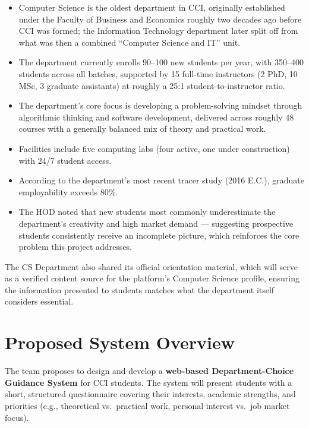 \documentclass[12pt, a4paper]{article}
\begin{document}
\begin{itemize}[leftmargin=1.5em, itemsep=3pt]
\item Computer Science is the oldest department in CCI, originally established under the Faculty of Business and Economics roughly two decades ago before CCI was formed; the Information Technology department later split off from what was then a combined ``Computer Science and IT'' unit.

\item The department currently enrolls 90–100 new students per year, with 350–400 students across all batches, supported by 15 full-time instructors (2 PhD, 10 MSc, 3 graduate assistants) at roughly a 25:1 student-to-instructor ratio.

\item The department's core focus is developing a problem-solving mindset through algorithmic thinking and software development, delivered across roughly 48 courses with a generally balanced mix of theory and practical work.

\item Facilities include five computing labs (four active, one under construction) with 24/7 student access.

\item According to the department's most recent tracer study (2016 E.C.), graduate employability exceeds 80\%.

\item The HOD noted that new students most commonly underestimate the department's creativity and high market demand — suggesting prospective students consistently receive an incomplete picture, which reinforces the core problem this project addresses.
\end{itemize}

The CS Department also shared its official orientation material, which will serve as a verified content source for the platform's Computer Science profile, ensuring the information presented to students matches what the department itself considers essential.

\section{Proposed System Overview}

The team proposes to design and develop a \textbf{web-based Department-Choice Guidance System} for CCI students. The system will present students with a short, structured questionnaire covering their interests, academic strengths, and priorities (e.g., theoretical vs.\ practical work, personal interest vs.\ job market focus). 
\end{document}
